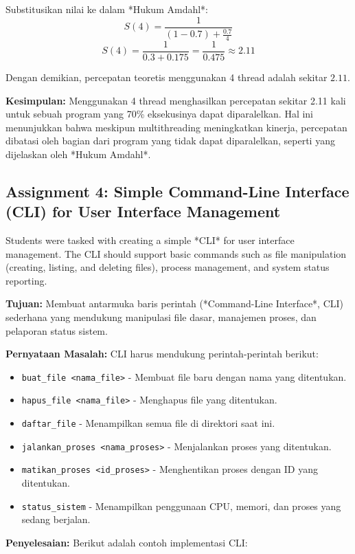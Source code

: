 \documentclass[12pt]{article}
\begin{document}
Substitusikan nilai ke dalam *Hukum Amdahl*:
\[
S(4) = \frac{1}{(1 - 0.7) + \frac{0.7}{4}}
\]
\[
S(4) = \frac{1}{0.3 + 0.175} = \frac{1}{0.475} \approx 2.11
\]

Dengan demikian, percepatan teoretis menggunakan 4 thread adalah sekitar \( 2.11 \).

\textbf{Kesimpulan:}  
Menggunakan 4 thread menghasilkan percepatan sekitar 2.11 kali untuk sebuah program yang 70\% eksekusinya dapat diparalelkan. Hal ini menunjukkan bahwa meskipun multithreading meningkatkan kinerja, percepatan dibatasi oleh bagian dari program yang tidak dapat diparalelkan, seperti yang dijelaskan oleh *Hukum Amdahl*.


\subsection{Assignment 4: Simple Command-Line Interface (CLI) for User Interface Management}
Students were tasked with creating a simple *CLI* for user interface management. The CLI should support basic commands such as file manipulation (creating, listing, and deleting files), process management, and system status reporting.

\textbf{Tujuan:}  
Membuat antarmuka baris perintah (*Command-Line Interface*, CLI) sederhana yang mendukung manipulasi file dasar, manajemen proses, dan pelaporan status sistem.

\textbf{Pernyataan Masalah:}  
CLI harus mendukung perintah-perintah berikut:
\begin{itemize}
    \item \texttt{buat\_file <nama\_file>} - Membuat file baru dengan nama yang ditentukan.
    \item \texttt{hapus\_file <nama\_file>} - Menghapus file yang ditentukan.
    \item \texttt{daftar\_file} - Menampilkan semua file di direktori saat ini.
    \item \texttt{jalankan\_proses <nama\_proses>} - Menjalankan proses yang ditentukan.
    \item \texttt{matikan\_proses <id\_proses>} - Menghentikan proses dengan ID yang ditentukan.
    \item \texttt{status\_sistem} - Menampilkan penggunaan CPU, memori, dan proses yang sedang berjalan.
\end{itemize}

\textbf{Penyelesaian:}  
Berikut adalah contoh implementasi CLI:
\end{document}
